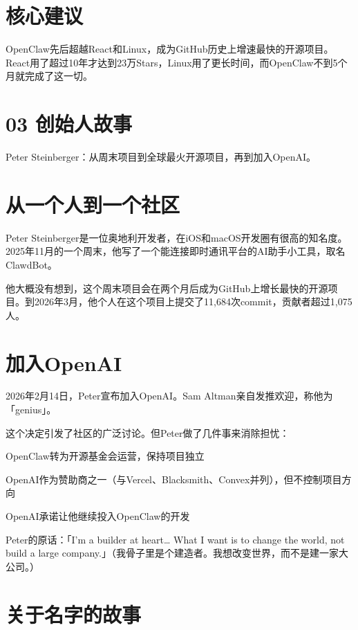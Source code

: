 \documentclass[
  10
]{article}
\begin{document}
\section{核心建议}\label{ux6838ux5fc3ux5efaux8bae}

OpenClaw先后超越React和Linux，成为GitHub历史上增速最快的开源项目。React用了超过10年才达到23万Stars，Linux用了更长时间，而OpenClaw不到5个月就完成了这一切。

\section{03 创始人故事}\label{ux521bux59cbux4ebaux6545ux4e8b}

Peter Steinberger：从周末项目到全球最火开源项目，再到加入OpenAI。

\section{从一个人到一个社区}\label{ux4eceux4e00ux4e2aux4ebaux5230ux4e00ux4e2aux793eux533a}

Peter
Steinberger是一位奥地利开发者，在iOS和macOS开发圈有很高的知名度。2025年11月的一个周末，他写了一个能连接即时通讯平台的AI助手小工具，取名ClawdBot。

他大概没有想到，这个周末项目会在两个月后成为GitHub上增长最快的开源项目。到2026年3月，他个人在这个项目上提交了11,684次commit，贡献者超过1,075人。

\section{加入OpenAI}\label{ux52a0ux5165openai}

2026年2月14日，Peter宣布加入OpenAI。Sam
Altman亲自发推欢迎，称他为「genius」。

这个决定引发了社区的广泛讨论。但Peter做了几件事来消除担忧：

OpenClaw转为开源基金会运营，保持项目独立

OpenAI作为赞助商之一（与Vercel、Blacksmith、Convex并列），但不控制项目方向

OpenAI承诺让他继续投入OpenClaw的开发

Peter的原话：「I'm a builder at heart\ldots{} What I want is to change
the world, not build a large
company.」（我骨子里是个建造者。我想改变世界，而不是建一家大公司。）

\section{关于名字的故事}\label{ux5173ux4e8eux540dux5b57ux7684ux6545ux4e8b}
\end{document}
